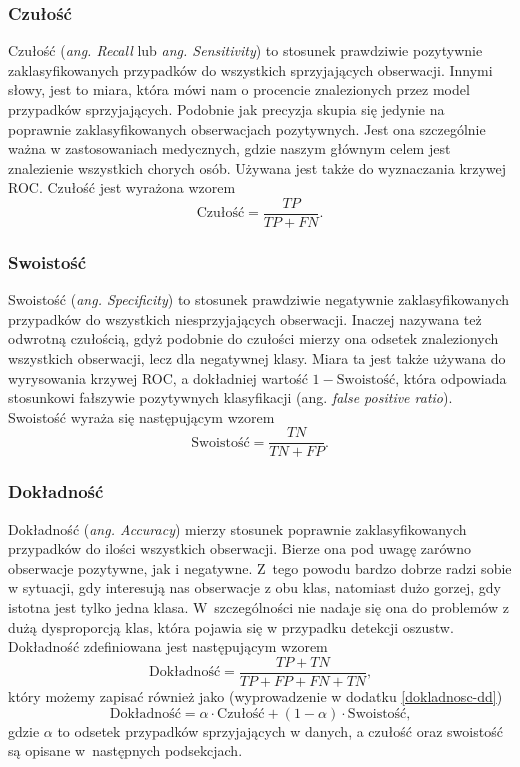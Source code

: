 \documentclass[inzynierska]{pwr_wmat_praca_dyplomowa}
\theoremstyle{plain}
\numberwithin{theorem}{chapter}
\theoremstyle{definition}
\numberwithin{theorem}{chapter}
\begin{document}
\subsubsection{Czułość}
Czułość (\textit{ang. Recall} lub \textit{ang. Sensitivity}) to stosunek prawdziwie pozytywnie zaklasyfikowanych przypadków do wszystkich sprzyjających obserwacji. Innymi słowy, jest to miara, która mówi nam o procencie znalezionych przez model przypadków sprzyjających. Podobnie jak precyzja skupia się jedynie na poprawnie zaklasyfikowanych obserwacjach pozytywnych. Jest ona szczególnie ważna w zastosowaniach medycznych, gdzie naszym głównym celem jest znalezienie wszystkich chorych osób. Używana jest także do wyznaczania krzywej ROC. Czułość jest wyrażona wzorem
$$ \text{Czułość}= \frac{TP}{TP + FN} \text{.}$$

\subsubsection{Swoistość}
Swoistość (\textit{ang. Specificity}) to stosunek prawdziwie negatywnie zaklasyfikowanych przypadków do wszystkich niesprzyjających obserwacji. Inaczej nazywana też odwrotną czułością, gdyż podobnie do czułości mierzy ona odsetek znalezionych wszystkich obserwacji, lecz dla negatywnej klasy. Miara ta jest także używana do wyrysowania krzywej ROC, a dokładniej wartość $1- \text{Swoistość}$, która odpowiada stosunkowi fałszywie pozytywnych klasyfikacji (ang. \textit{false positive ratio}). Swoistość wyraża się następującym wzorem
$$ \text{Swoistość}= \frac{TN}{TN + FP} \text{.}$$

\subsubsection{Dokładność}
Dokładność (\textit{ang. Accuracy}) mierzy stosunek poprawnie zaklasyfikowanych przypadków do ilości wszystkich obserwacji. Bierze ona pod uwagę zarówno obserwacje pozytywne, jak i negatywne. Z~tego powodu bardzo dobrze radzi sobie w sytuacji, gdy interesują nas obserwacje z obu klas, natomiast dużo gorzej, gdy istotna jest tylko jedna klasa. W~szczególności nie nadaje się ona do problemów z dużą dysproporcją klas, która pojawia się w przypadku detekcji oszustw. Dokładność zdefiniowana jest następującym wzorem
$$ \text{Dokładność} = \frac{TP + TN}{TP + FP + FN + TN} \text{,}$$
który możemy zapisać również jako (wyprowadzenie w dodatku \ref{dokladnosc-dd})
$$ \text{Dokładność} = \alpha \cdot \text{Czułość} + (1-\alpha) \cdot \text{Swoistość} \text{,}$$
gdzie $\alpha$ to odsetek przypadków sprzyjających w danych, a czułość oraz swoistość są opisane w~następnych podsekcjach. 
\end{document}
